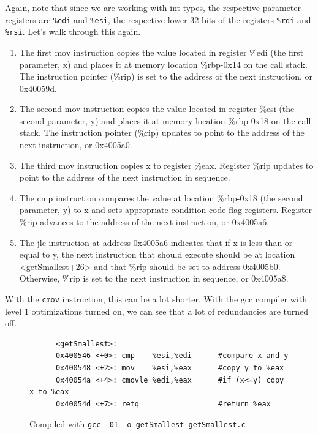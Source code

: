   Again, note that since we are working with int types, the respective parameter registers are \texttt{\%edi} and \texttt{\%esi}, the respective lower 32-bits of the registers \texttt{\%rdi} and \texttt{\%rsi}. Let's walk through this again. 
  \begin{enumerate}
    \item The first mov instruction copies the value located in register \%edi (the first parameter, x) and places it at memory location \%rbp-0x14 on the call stack. The instruction pointer (\%rip) is set to the address of the next instruction, or 0x40059d.
    \item The second mov instruction copies the value located in register \%esi (the second parameter, y) and places it at memory location \%rbp-0x18 on the call stack. The instruction pointer (\%rip) updates to point to the address of the next instruction, or 0x4005a0.
    \item The third mov instruction copies x to register \%eax. Register \%rip updates to point to the address of the next instruction in sequence.
    \item The cmp instruction compares the value at location \%rbp-0x18 (the second parameter, y) to x and sets appropriate condition code flag registers. Register \%rip advances to the address of the next instruction, or 0x4005a6.
    \item The jle instruction at address 0x4005a6 indicates that if x is less than or equal to y, the next instruction that should execute should be at location <getSmallest+26> and that \%rip should be set to address 0x4005b0. Otherwise, \%rip is set to the next instruction in sequence, or 0x4005a8.
  \end{enumerate}

  With the \texttt{cmov} instruction, this can be a lot shorter. With the gcc compiler with level 1 optimizations turned on, we can see that a lot of redundancies are turned off. 

  \begin{figure}[H]
    \centering 
    \begin{lstlisting}
      <getSmallest>:
      0x400546 <+0>: cmp    %esi,%edi      #compare x and y
      0x400548 <+2>: mov    %esi,%eax      #copy y to %eax
      0x40054a <+4>: cmovle %edi,%eax      #if (x<=y) copy x to %eax
      0x40054d <+7>: retq                  #return %eax
    \end{lstlisting}
    \caption{Compiled with \texttt{gcc -01 -o getSmallest getSmallest.c} } 
    \label{fig:if_statement_optimized}
  \end{figure}

